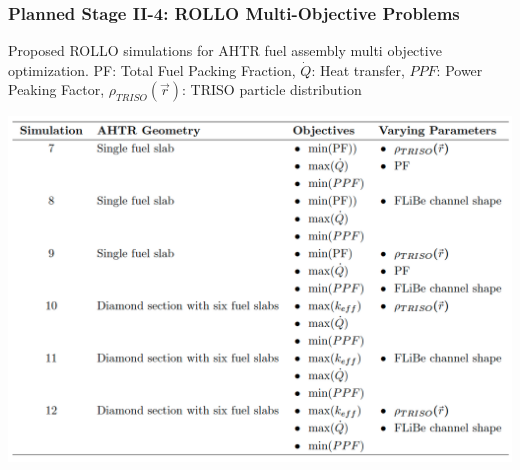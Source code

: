 \begin{frame}
    \frametitle{Planned Stage II-4: ROLLO Multi-Objective Problems}
    \begin{table}
        \caption{Proposed ROLLO simulations for AHTR fuel assembly multi 
        objective optimization.
        PF: Total Fuel Packing Fraction, $\dot{Q}$: Heat transfer, $PPF$: Power Peaking Factor, 
        $\rho_{TRISO}(\vec{r})$: \gls{TRISO} particle distribution}
        \includegraphics[width=0.7\linewidth]{figures/multi-obj.png}
    \end{table}
\end{frame}